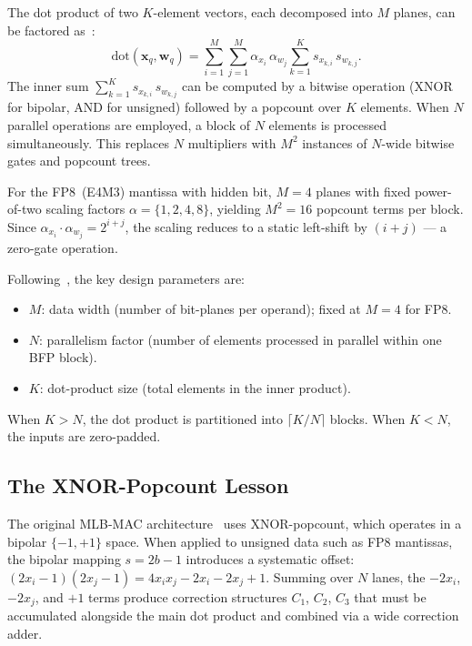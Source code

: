 \documentclass[conference]{IEEEtran}
\begin{document}
The dot product of two $K$-element vectors, each decomposed into $M$
planes, can be factored as~\cite{b1}:
\begin{equation}
    \text{dot}(\mathbf{x}_q, \mathbf{w}_q) =
    \sum_{i=1}^{M} \sum_{j=1}^{M} \alpha_{x_i}\,\alpha_{w_j}
    \sum_{k=1}^{K} s_{x_{k,i}}\, s_{w_{k,j}}.
    \label{eq:mlb_dot}
\end{equation}
The inner sum $\sum_{k=1}^{K} s_{x_{k,i}}\, s_{w_{k,j}}$ can be
computed by a bitwise operation (XNOR for bipolar, AND for unsigned)
followed by a popcount over $K$ elements.  When $N$ parallel
operations are employed, a block of $N$ elements is processed
simultaneously.  This replaces $N$ multipliers with $M^2$ instances
of $N$-wide bitwise gates and popcount trees.

For the FP8~(E4M3) mantissa with hidden bit, $M = 4$ planes with
fixed power-of-two scaling factors $\alpha = \{1, 2, 4, 8\}$,
yielding $M^2 = 16$ popcount terms per block.  Since
$\alpha_{x_i} \cdot \alpha_{w_j} = 2^{i+j}$, the scaling reduces
to a static left-shift by $(i+j)$ --- a zero-gate operation.

Following~\cite{b1}, the key design parameters are:
\begin{itemize}
    \item $M$: data width (number of bit-planes per operand); fixed
    at $M = 4$ for FP8.
    \item $N$: parallelism factor (number of elements processed in
    parallel within one BFP block).
    \item $K$: dot-product size (total elements in the inner product).
\end{itemize}
When $K > N$, the dot product is partitioned into
$\lceil K/N \rceil$ blocks.  When $K < N$, the inputs are
zero-padded.

\subsection{The XNOR-Popcount Lesson}
\label{ssec:xnor_lesson}

The original MLB-MAC architecture~\cite{b1} uses XNOR-popcount,
which operates in a bipolar $\{-1,+1\}$ space.  When applied to
unsigned data such as FP8 mantissas, the bipolar mapping $s = 2b - 1$
introduces a systematic offset: $(2x_i-1)(2x_j-1) = 4x_ix_j -
2x_i - 2x_j + 1$.  Summing over $N$ lanes, the $-2x_i$, $-2x_j$,
and $+1$ terms produce correction structures $C_1$, $C_2$, $C_3$
that must be accumulated alongside the main dot product and combined
via a wide correction adder.
\end{document}
